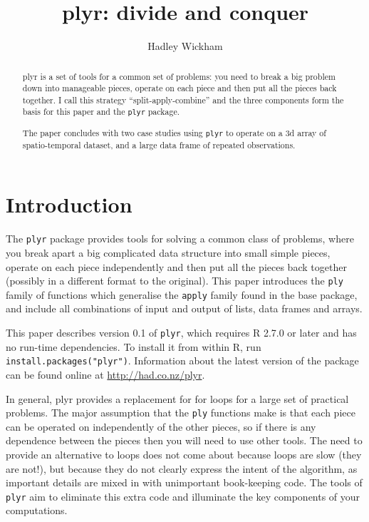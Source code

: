 \documentclass{scrartcl}
\title{plyr: divide and conquer}
\author{Hadley Wickham}
\newcommand{\plyr}{{\tt plyr}\xspace}
\begin{document}
\maketitle

%


\begin{abstract}
plyr is a set of tools for a common set of problems: you need to break a big problem down into manageable pieces, operate on each piece and then put all the pieces back together.  I call this strategy ``split-apply-combine'' and the three components form the basis for this paper and the \plyr package.   

The paper concludes with two case studies using \plyr to operate on a 3d array of spatio-temporal dataset, and a large data frame of repeated observations.

\end{abstract}

\section{Introduction}

The {\tt plyr} package provides tools for solving a common class of problems, where you break apart a big complicated data structure into small simple pieces, operate on each piece independently and then put all the pieces back together (possibly in a different format to the original).  This paper introduces the {\tt ply} family of functions which generalise the {\tt apply} family found in the base package, and include all combinations of input and output of lists, data frames and arrays.

This paper describes version 0.1 of {\tt plyr}, which requires R 2.7.0 or later and has no run-time dependencies.  To install it from within R, run {\tt install.packages("plyr")}.  Information about the latest version of the package can be found online at \url{http://had.co.nz/plyr}.  


In general, plyr provides a replacement for for loops for a large set of practical problems.  The major assumption that the {\tt ply} functions make is that each piece can be operated on independently of the other pieces, so if there is any dependence between the pieces then you will need to use other tools.  The need to provide an alternative to loops does not come about because loops are slow (they are not!), but because they do not clearly express the intent of the algorithm, as important details are mixed in with unimportant book-keeping code. The tools of {\tt plyr} aim to eliminate this extra code and illuminate the key components of your computations.
\end{document}
